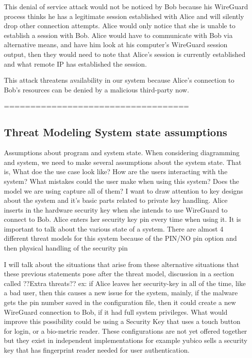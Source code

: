\documentclass [11pt, proquest] {uwthesis}[2020/02/24]
\begin{document}
This denial of service attack would not be noticed by Bob because his WireGuard process thinks he has a legitimate session established with Alice and will silently drop other connection attempts. Alice would only notice that she is unable to establish a session with Bob. Alice would have to communicate with Bob via alternative means, and have him look at his computer's WireGuard session output, then they would need to note that Alice's session is currently established and what remote IP has established the session.

This attack threatens availability in our system because Alice's connection to Bob's resources can be denied by a malicious third-party now.

===================================

\subsection{Threat Modeling System state assumptions}
Assumptions about program and system state. When considering diagramming and system, we need to make several assumptions about the system state. That is, What doe the use case look like? How are the users interacting with the system? What mistakes could the user make when using this system? Does the model we are using capture all of them?
I want to draw attention to key designs about the system and it's basic parts related to private key handling.
Alice inserts in the hardware security key when she intends to use WireGuard to connect to Bob. Alice enters her security key pin every time when using it. 
It is important to talk about the various state of a system. There are almost 4 different threat models for this system because of the PIN/NO pin option and then physical handling of the security pin

I will talk about the situations that arise from these alternative situations that these previous statements pose after the threat model, discussion in a section called ??Extra threats??
    ex: if Alice leaves her security-key in all of the time, like a bad user, then this causes a new issue for the system, mainly, if the malware gets the pin number saved in the configuration file, then it could create a new WireGuard connection to Bob, if it had full system privileges.
    What would improve this possibility could be using a Security Key that uses a touch button for login, or a bio-metric reader. These configurations are not yet offered together but they exist in independent implementations for example yubico sells a security key that has fingerprint reader needed for user authentication\cite{yubico_yubikey_2022}. 
\end{document}
